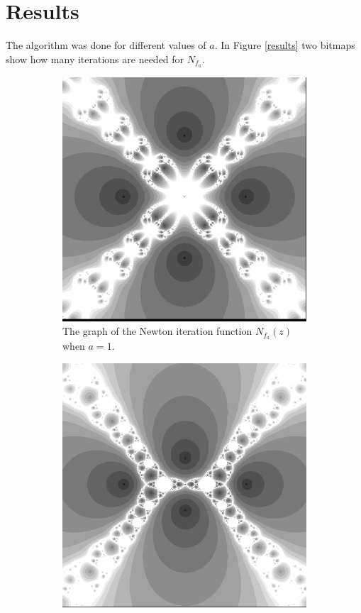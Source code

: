 \section{Results}
The algorithm was done for different values of $a$. In Figure \ref{results} two bitmaps show how many iterations are needed for $N_{f_a}$.

\begin{figure}[h!]
	\centering
	\begin{subfigure}[b]{0.4\textwidth}
		\includegraphics[width=\textwidth]{a=1.png}
		\caption{The graph of the Newton iteration function $N_{f_{a}}(z)$ when $a=1$.}
		\label{a1}
	\end{subfigure}
	\hspace{5pt} %
	\begin{subfigure}[b]{0.4\textwidth}
		\includegraphics[width=\textwidth]{a=018.png}

\end{subfigure}
\end{figure}
